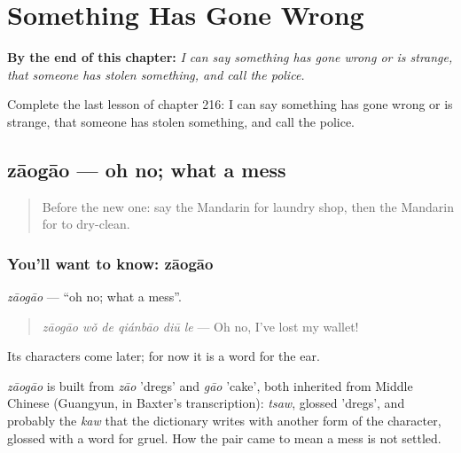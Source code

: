 
\chapter{Something Has Gone Wrong}
\label{ch:zh-something-has-gone-wrong}

\begin{chapteropening}
\textbf{By the end of this chapter:} \emph{I can say something has gone wrong or is strange, that someone has stolen something, and call the police.}

Complete the last lesson of chapter 216: I can say something has gone wrong or is strange, that someone has stolen something, and call the police.
\end{chapteropening}

\section[zāogāo]{zāogāo — oh no; what a mess}

\label{lesson:ZH-C216-zaogao}



\begin{quote}
Before the new one: say the Mandarin for laundry shop, then the Mandarin for to dry-clean.
\end{quote}

\subsection*{You'll want to know: zāogāo}
\emph{zāogāo} — \textquotedblleft{}oh no; what a mess\textquotedblright{}.

\begin{quote}
\emph{zāogāo wǒ de qiánbāo diū le} — Oh no, I've lost my wallet!
\end{quote}

Its characters come later; for now it is a word for the ear.

\begin{cousinweb}
\emph{zāogāo} is built from \emph{zāo} 'dregs' and \emph{gāo} 'cake', both inherited from Middle Chinese (Guangyun, in Baxter's transcription): \emph{tsaw}, glossed 'dregs', and probably the \emph{kaw} that the dictionary writes with another form of the character, glossed with a word for gruel. How the pair came to mean a mess is not settled.
\end{cousinweb}

